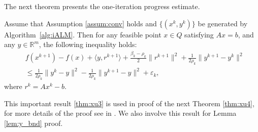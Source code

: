 \documentclass[runningheads]{llncs}
\begin{document}
%	
%	
	The next theorem presents the one-iteration progress estimate. 
	\begin{theorem}
		\label{thm:xu3}
		Assume that Assumption \ref{assum:conv} holds and $\{(x^k,y^k)\}$ be generated by Algorithm~\ref{alg:iALM}. Then for any feasible point $x\in Q$ satisfying $Ax=b$, and any $y\in\mathbb{R}^m$, the following inequality holds:
		\begin{align}
			&
			f(x^{k+1})-f(x)
			+\langle y,r^{k+1}\rangle
			+\frac{\beta_k-\rho_k}{2}\|r^{k+1}\|^2
			+\frac{1}{2\rho_k}\|y^{k+1}-y^k\|^2
			\nonumber\\
			&
			\leq
			\frac{1}{2\rho_k}\|y^k-y\|^2
			-
			\frac{1}{2\rho_k}\|y^{k+1}-y\|^2
			+\varepsilon_k ,
			\label{eq:one_step_progress}
		\end{align}
		where $r^k = Ax^k - b$.
	\end{theorem}

	This important result \eqref{thm:xu3} is used in proof of the next Theorem \ref{thm:xu4}, for more details of the proof see in \cite{xu2021iteration}. We also involve this result for Lemma \ref{lem:y_bnd} proof.
	
\end{document}
